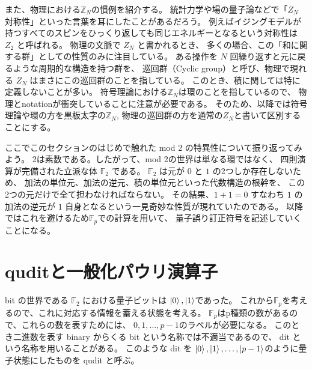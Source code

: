 \documentclass[../master.tex]{subfiles}
\begin{document}
また、物理における$\mathbb{Z}_N$の慣例を紹介する。
統計力学や場の量子論などで「$Z_N$ 対称性」といった言葉を耳にしたことがあるだろう。
例えばイジングモデルが持つすべてのスピンをひっくり返しても同じエネルギーとなるという対称性は $Z_2$ と呼ばれる。
物理の文脈で $Z_N$ と書かれるとき、
多くの場合、この「和に関する群」としての性質のみに注目している。
ある操作を $N$ 回繰り返すと元に戻るような周期的な構造を持つ群を、
巡回群（Cyclic group）と呼び、物理で現れる $Z_N$ はまさにこの巡回群のことを指している。
このとき、積に関しては特に定義しないことが多い。
符号理論における$\mathbb{Z}_N$は環のことを指しているので、
物理とnotationが衝突していることに注意が必要である。
そのため、以降では符号理論や環の方を黒板太字の$\mathbb{Z}_N$,
物理の巡回群の方を通常の$Z_N$と書いて区別することにする。

ここでこのセクションのはじめで触れた mod 2 の特異性について振り返ってみよう。
2は素数である。したがって、mod 2の世界は単なる環ではなく、
四則演算が完備された立派な体 $\mathbb{F}_2$ である。
$\mathbb{F}_2$ は元が $0$ と $1$ の2つしか存在しないため、
加法の単位元、加法の逆元、積の単位元といった代数構造の根幹を、
この2つの元だけで全て担わなければならない。
その結果、$1+1=0$ すなわち $1$ の加法の逆元が $1$ 自身となるという一見奇妙な性質が現れていたのである。
以降ではこれを避けるため$\mathbb{F}_p$での計算を用いて、
量子誤り訂正符号を記述していくことになる。


\section{quditと一般化パウリ演算子}
bit の世界である $\mathbb{F}_2$ における量子ビットは $\ket{0},\ket{1}$であった。
これから$\mathbb{F}_p$を考えるので、これに対応する情報を蓄える状態を考える。
$\mathbb{F}_p$はp種類の数があるので、これらの数を表すためには、
$0,1,\ldots,p-1$のラベルが必要になる。
このとき二進数を表す binary からくる bit という名称では不適当であるので、
dit という名称を用いることがある。
このような dit を
$\ket{0},\ket{1},\ldots,\ket{p-1}$のように量子状態にしたものを qudit と呼ぶ。
\end{document}
